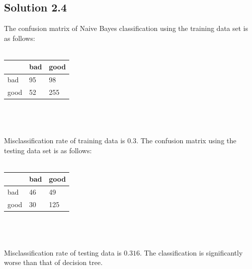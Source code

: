 \documentclass[11pt,english]{article}
\begin{document}
\subsection*{Solution 2.4}
The confusion matrix of Naive Bayes classification using the training data set
is as follows:\\\\
\begin{tabular}{ l | l | l }
  & bad & good \\
  \hline
  bad & 95 & 98 \\
  good & 52 & 255
\end{tabular}
\\\\\\
Misclassification rate of training data is $0.3$.
The confusion matrix using the testing data set is as follows:\\\\
\begin{tabular}{ l | l | l }
  & bad & good \\
  \hline
  bad & 46 & 49 \\
  good & 30 & 125
\end{tabular}
\\\\\\
Misclassification rate of testing data is $0.316$. The classification is
significantly worse than that of decision tree.
\end{document}
